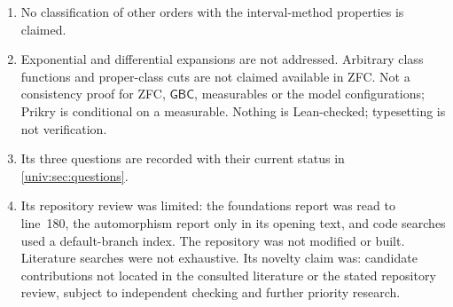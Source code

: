 \documentclass[11pt,letterpaper]{article}
\numberwithin{equation}{section}
\theoremstyle{definition}
\theoremstyle{remark}
\newcommand{\GBC}{\mathsf{GBC}}
\begin{document}
\begin{enumerate}[label=01.\arabic*,leftmargin=3.2em]
claimed unique; set-completeness does not imply class-completeness; the
negative result assumes Global Choice, with no optimality claim for that
assumption.
\item No classification of other orders with the interval-method properties is
claimed.
\item Exponential and differential expansions are not addressed. Arbitrary class
functions and proper-class cuts are not claimed available in ZFC. Not a
consistency proof for ZFC, $\GBC$, measurables or the model configurations;
Prikry is conditional on a measurable. Nothing is Lean-checked; typesetting is
not verification.
\item Its three questions are recorded with their current status in
\cref{univ:sec:questions}.
\item Its repository review was limited: the foundations report was read to
line~180, the automorphism report only in its opening text, and code searches
used a default-branch index. The repository was not modified or built.
Literature searches were not exhaustive. Its novelty claim was: candidate
contributions not located in the consulted literature or the stated repository
review, subject to independent checking and further priority research.
\end{enumerate}
\end{document}
